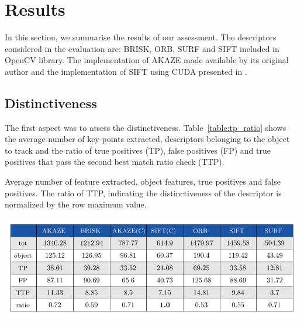 \section{Results}

In this section, we summarise the results of our assessment. The descriptors considered in the evaluation are: BRISK, ORB, SURF and SIFT included in OpenCV library. The implementation of AKAZE made available by its original author \cite{alcantarilla13} and the implementation of SIFT using CUDA presented in \cite{bjorkmann14}.

\subsection{Distinctiveness}


The first aspect was to assess the distinctiveness. Table~\ref{table:tp_ratio} shows the average number of key-points extracted, descriptors belonging to the object to track and the ratio of true positives (TP), false positives (FP) and true positives that pass the second best match ratio check (TTP). 

\begin{table}[!h]
\caption{Average number of feature extracted, object features, true positives and false positives. The ratio of TTP, indicating the distinctiveness of the descriptor is normalized by the row maximum value.}
\vspace{-2mm} 
\centerline{%
		\includegraphics[width=0.98\linewidth]{tables/descriptivness_ratio_raw.pdf}}
    \vspace{-2mm} 
	\label{table:tp_ratio}
\end{table}

